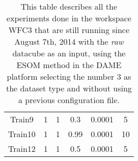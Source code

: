 \documentclass[11pt,fleqn]{book} %
\begin{document}
\begin{table}[h!]
\begin{tabular}{ c c c c c c }
																																																																																																																																																																																																																																										          Train9 & 1 & 1 & 0.3 & 0.0001 & 5\\
																																																																																																																																																																																																																																											      Train10 & 1 & 1 & 0.99 & 0.0001 & 10\\
																																																																																																																																																																																																																																											          Train12 & 1 & 1 & 0.5 & 0.0001 & 5\\
																																																																																																																																																																																																																																												      
																																																																																																																																																																																																																																												          \hline
																																																																																																																																																																																																																																													    \end{tabular}
																																																																																																																																																																																																																																													      \caption{This table describes all the experiments done in the workspace WFC3 that are still running since August 7th, 2014 with the \emph{raw} datacube as an input, using the ESOM method in the DAME platform selecting the number 3 as the dataset type and without using a previous configuration file.}
																																																																																																																																																																																																																																													        \label{tab:ds9running}
																																																																																																																																																																																																																																														\end{table}
\end{document}
